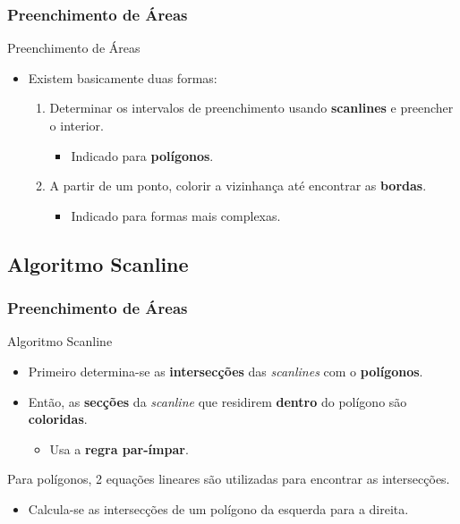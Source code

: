 \documentclass{beamer}
\begin{document}
\begin{frame}
\frametitle{Preenchimento de Áreas}

		\begin{block}{Preenchimento de Áreas}
		\begin{itemize}
			\item Existem basicamente duas formas:
				\begin{enumerate}
					\item Determinar os intervalos de preenchimento usando \textbf{scanlines} e preencher o interior.
					\begin{itemize}
						\item Indicado para \textbf{polígonos}.
					\end{itemize}
					\item A partir de um ponto, colorir a vizinhança até encontrar as \textbf{bordas}.
					\begin{itemize}
						\item Indicado para formas mais complexas.
					\end{itemize}
				\end{enumerate}
		\end{itemize}
		\end{block}
\end{frame}

\subsection{Algoritmo Scanline}
\begin{frame}
\frametitle{Preenchimento de Áreas}

		\begin{block}{Algoritmo Scanline}
		\begin{itemize}
			\item Primeiro determina-se as \textbf{intersecções} das \textit{scanlines} com o \textbf{polígonos}.
			\item Então, as \textbf{secções} da \textit{scanline} que residirem \textbf{dentro} do polígono são \textbf{coloridas}.
				\begin{itemize}
					\item Usa a \textbf{regra par-ímpar}.	
				\end{itemize}				 
		\end{itemize}
		\end{block}
		\begin{block}{}
			Para polígonos, 2 equações lineares são utilizadas para encontrar as intersecções.
			\begin{itemize}
				\item Calcula-se as intersecções de um polígono da esquerda para a direita.
			\end{itemize}
		\end{block}
\end{frame}
\end{document}
